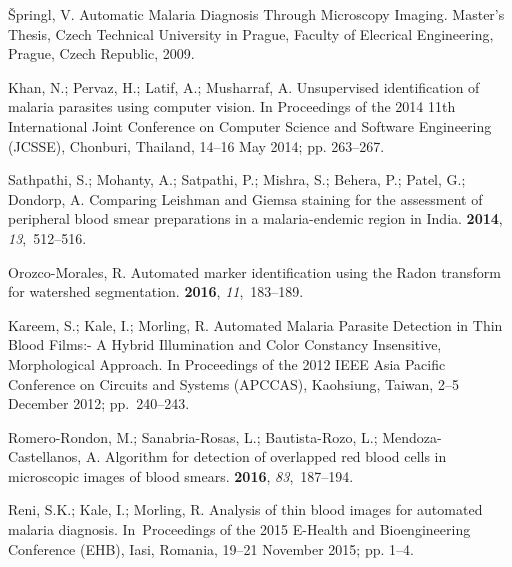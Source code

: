 \documentclass[sensors,review,accept,moreauthors,pdftex,10pt,a4paper]{mdpi}
\begin{document}
\begin{thebibliography}{999}
{\v{S}}pringl, V.
\newblock Automatic Malaria Diagnosis Through Microscopy Imaging.
\newblock Master's Thesis, Czech Technical University in Prague, Faculty of
  Elecrical Engineering, Prague, Czech Republic,  2009.

Khan, N.; Pervaz, H.; Latif, A.; Musharraf, A.
\newblock Unsupervised identification of malaria parasites using computer
  vision.
\newblock  In Proceedings of the 2014 11th International Joint Conference on
  Computer Science and Software Engineering (JCSSE), Chonburi, Thailand, 14--16 May 2014; pp. 263--267.

Sathpathi, S.; Mohanty, A.; Satpathi, P.; Mishra, S.; Behera, P.; Patel, G.;
  Dondorp, A.
\newblock Comparing Leishman and Giemsa staining for the assessment of
  peripheral blood smear preparations in a malaria-endemic region in India.
 {\bf 2014}, {\em 13},~512--516.

 Orozco-Morales, R. 
\newblock Automated marker identification using the Radon transform for
  watershed segmentation.
 {\bf 2016}, {\em 11},~183--189.

Kareem, S.; Kale, I.; Morling, R.
\newblock Automated Malaria Parasite Detection in Thin Blood Films:- A Hybrid
  Illumination and Color Constancy Insensitive, Morphological Approach.
\newblock  In Proceedings of the 2012 IEEE Asia Pacific Conference on Circuits
  and Systems (APCCAS), Kaohsiung, Taiwan, 2--5 December 2012; pp.~240--243.

Romero-Rondon, M.; Sanabria-Rosas, L.; Bautista-Rozo, L.; Mendoza-Castellanos,
  A.
\newblock Algorithm for detection of overlapped red blood cells in microscopic
  images of blood smears.
 {\bf 2016}, {\em 83},~187--194.

Reni, S.K.; Kale, I.; Morling, R. Analysis of thin blood images for automated malaria diagnosis.  In~Proceedings of the 2015 E-Health and Bioengineering Conference
  (EHB),  Iasi, Romania, 19--21 November 2015; pp. 1--4. 


\end{thebibliography}
\end{document}
